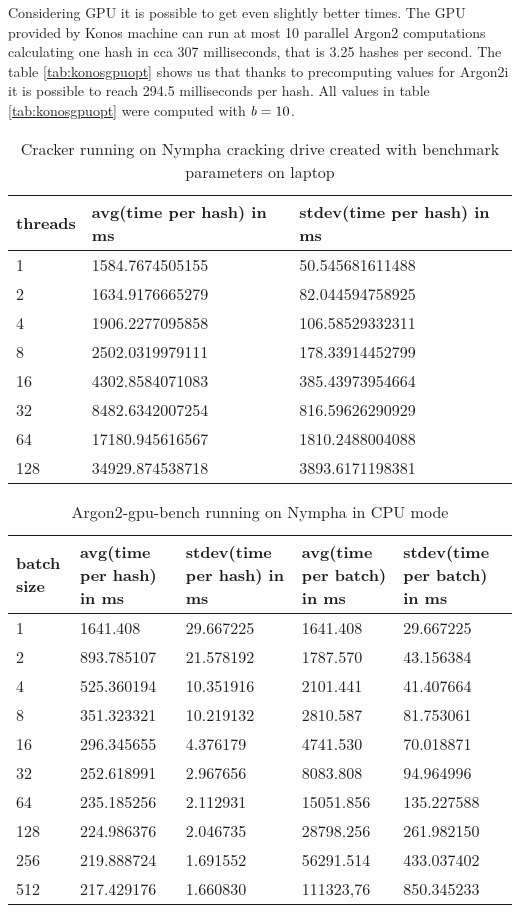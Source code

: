 \documentclass[nolof]{fithesis3}
\begin{document}
Considering GPU it is possible to get even slightly better times. The GPU provided by Konos machine can run at most 10 parallel Argon2 computations calculating one hash in cca 307 milliseconds, that is 3.25 hashes per second. The table \ref{tab:konosgpuopt} shows us that thanks to precomputing values for Argon2i it is possible to reach 294.5 milliseconds per hash. All values in table \ref{tab:konosgpuopt} were computed with $\emph{b} = 10$.

\noindent
\begin{table}
\caption{Cracker running on Nympha cracking drive created with benchmark parameters on laptop}
\label{tab:nymphacracker}
\begin{tabularx}{\textwidth}{| X | X | X |}
\hline
threads & avg(time per hash) in ms & stdev(time per hash) in ms\\
\hline
1 & 1584.7674505155 & 50.545681611488\\
\hline
2 & 1634.9176665279 & 82.044594758925\\
\hline
4 & 1906.2277095858 & 106.58529332311\\
\hline
8 & 2502.0319979111 & 178.33914452799\\
\hline
16 & 4302.8584071083 & 385.43973954664\\
\hline
32 & 8482.6342007254 & 816.59626290929\\
\hline
64 & 17180.945616567 & 1810.2488004088\\
\hline
128 & 34929.874538718 & 3893.6171198381\\
\hline
\end{tabularx}
\end{table}

\noindent
\begin{table}
\caption{Argon2-gpu-bench running on Nympha in CPU mode}
\label{tab:nymphacpu}
\begin{tabularx}{\textwidth}{| X | X | X | X | X |}
\hline
batch size & avg(time per hash) in ms & stdev(time per hash) in ms & avg(time per batch) in ms & stdev(time per batch) in ms\\
\hline
1 & 1641.408 & 29.667225 & 1641.408 & 29.667225 \\
\hline
2 & 893.785107 & 21.578192 & 1787.570 & 43.156384 \\
\hline
4 & 525.360194 & 10.351916 & 2101.441 & 41.407664\\
\hline
8 & 351.323321 & 10.219132 & 2810.587 & 81.753061\\
\hline
16 & 296.345655 & 4.376179 & 4741.530 & 70.018871\\
\hline
32 & 252.618991 & 2.967656 & 8083.808 & 94.964996\\
\hline
64 & 235.185256 & 2.112931 & 15051.856 & 135.227588\\
\hline
128 & 224.986376 & 2.046735 & 28798.256 & 261.982150\\
\hline
256 & 219.888724 & 1.691552 & 56291.514 & 433.037402\\
\hline
512 & 217.429176 & 1.660830 & 111323,76 & 850.345233\\
\hline
\end{tabularx}
\end{table}
\end{document}
